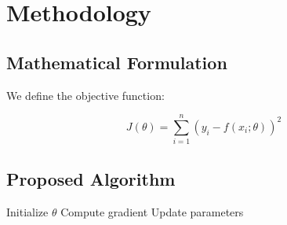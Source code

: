 \section{Methodology}

\subsection{Mathematical Formulation}
We define the objective function:

\begin{equation}
J(\theta) = \sum_{i=1}^{n} (y_i - f(x_i; \theta))^2
\end{equation}

\subsection{Proposed Algorithm}
\begin{algorithm}[H]
\caption{Gradient Descent}
\begin{algorithmic}
\STATE Initialize $\theta$
    \STATE Compute gradient
    \STATE Update parameters
\ENDFOR
\end{algorithmic}
\end{algorithm}
